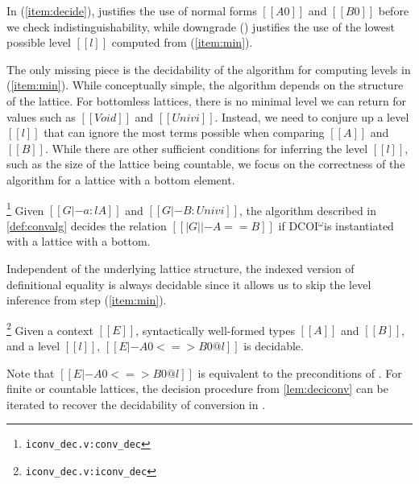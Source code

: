 \documentclass[acmsmall, screen=true, nonacm=true,
  review=\ifpublic false\else true\fi,
  anonymous=\ifanonymous true\else false\fi
]{acmart}
\makeatletter
\newcommand{\name}{\texorpdfstring{DCOI$^{\omega}$\@\xspace}{DCOI-omega}}
\newcommand{\suppl}[3]{{\scriptsize\texttt{#2:#3}}}
\newlength{\punctwidth}
\newcommand{\stack}[1]{%
  \settowidth{\punctwidth}{#1}%
  \hspace*{-\the\punctwidth}%
}
\makeatother
\begin{document}
In (\ref{item:decide}),  justifies the use of
normal forms $[[A0]]$ and $[[B0]]$
before we check indistinguishability, while downgrade
() justifies the
use of the lowest possible level $[[l]]$ computed from (\ref{item:min}).


The only missing piece is the decidability of the algorithm for
computing levels in (\ref{item:min}).
While conceptually simple, the algorithm depends
on the structure of the lattice. For bottomless
lattices, there is no minimal level we can return for values such as
$[[Void]]$ and $[[Univ i]]$. Instead, we need to conjure up a level
$[[l]]$ that can ignore the most terms possible when comparing
$[[A]]$ and $[[B]]$. While there are other sufficient conditions for
inferring the level $[[l]]$, such as the size of the lattice being
countable, we focus on the correctness of the algorithm for a lattice
with a bottom element.
\begin{theorem}
  \stack{.~}\footnote{\suppl{theories}{iconv\_dec.v}{conv\_dec}}
  \label{lem:decconv}
  Given $[[G |- a : l A]]$ and $[[G |- B : Univ i]]$, the algorithm
  described in \cref{def:convalg} decides the relation $[[|G| |- A ==
  B]]$ if \name is instantiated with a lattice with a bottom.
\end{theorem}

Independent of the underlying lattice structure, the
indexed version of definitional equality is always decidable since it
allows us to skip the level inference from step (\ref{item:min}).
\begin{theorem}
  \stack{.~}\footnote{\suppl{theories}{iconv\_dec.v}{iconv\_dec}}
  \label{lem:deciconv}
  Given a context $[[E]]$, syntactically well-formed types $[[A]]$ and
  $[[B]]$, and a level $[[l]]$, $[[E |- A0 <=> B0 @ l]]$ is decidable.
\end{theorem}
Note that $[[E |- A0 <=> B0 @ l]]$ is equivalent to the preconditions of .
For finite or countable lattices, the decision procedure from
\cref{lem:deciconv} can be iterated to recover the decidability
of conversion in .
\end{document}
